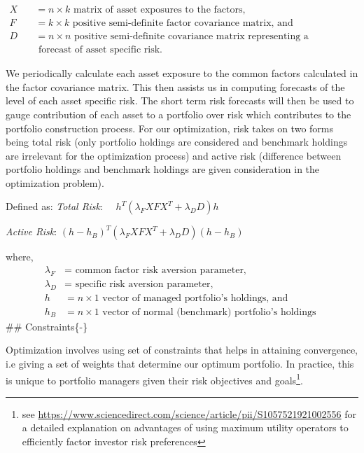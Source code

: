\documentclass[11pt,preprint, authoryear]{elsarticle}
\numberwithin{equation}{section}
\numberwithin{figure}{section}
\numberwithin{table}{section}
\let\rmarkdownfootnote\footnote%
\def\footnote{\protect\rmarkdownfootnote}
\begin{document}
\(\begin{array} {ll}X & =n \times k \text { matrix of asset exposures to the factors, } \\ F \quad &= k \times k \text { positive semi-definite factor covariance matrix, and } \\ D \quad &=n \times n \text { positive semi-definite covariance matrix representing a } \\ & \text { forecast of asset specific risk. }\end{array}\)

We periodically calculate each asset exposure to the common factors
calculated in the factor covariance matrix. This then assists us in
computing forecasts of the level of each asset specific risk. The short
term risk forecasts will then be used to gauge contribution of each
asset to a portfolio over risk which contributes to the portfolio
construction process. For our optimization, risk takes on two forms
being total risk (only portfolio holdings are considered and benchmark
holdings are irrelevant for the optimization process) and active risk
(difference between portfolio holdings and benchmark holdings are given
consideration in the optimization problem).

Defined as: \emph{Total Risk}:
\(\quad h^T\left(\lambda_F X F X^T+\lambda_D D\right) h\)

\emph{Active Risk}:
\(\left(h-h_B\right)^T\left(\lambda_F X F X^T+\lambda_D D\right)\left(h-h_B\right)\)

where, \[
\begin{aligned}
\lambda_F & =\text { common factor risk aversion parameter, } \\
\lambda_D & =\text { specific risk aversion parameter, } \\
h & =n \times 1 \text { vector of managed portfolio's holdings, and } \\
h_B & =n \times 1 \text { vector of normal (benchmark) portfolio's holdings }
\end{aligned}
\] \#\# Constraints\{-\}

Optimization involves using set of constraints that helps in attaining
convergence, i.e giving a set of weights that determine our optimum
portfolio. In practice, this is unique to portfolio managers given their
risk objectives and goals\footnote{see
  \url{https://www.sciencedirect.com/science/article/pii/S1057521921002556}
  for a detailed explanation on advantages of using maximum utility
  operators to efficiently factor investor risk preferences}.
\end{document}

